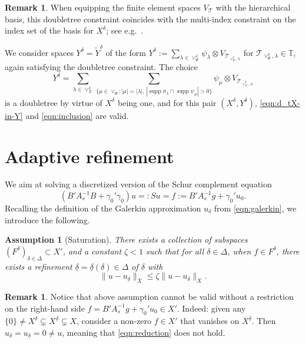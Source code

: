 \documentclass[11pt,a4paper,oneside,english]{amsart}
\numberwithin{equation}{section}
\numberwithin{theorem}{section}
\newtheorem{assum}[theorem]{Assumption}
\theoremstyle{definition}
\newtheorem{remark}[theorem]{Remark}
\DeclareMathOperator{\supp}{supp}
\newcommand{\T}{\mathcal{T}}
\newcommand{\udelta}{{\underline{\delta}}}
\begin{document}
\begin{remark}
  When equipping the finite element spaces $V_{\T}$ with the hierarchical basis,
  this doubletree constraint coincides with the multi-index constraint on the index
  set of the basis for $X^\delta$; see e.g.~\cite{TODO}.
\end{remark}

We consider spaces $Y^\delta = \tilde Y^\delta$ of the form
$Y^\delta := \sum_{\lambda \in \vee^\delta_\Psi} \psi_\lambda \otimes V_{\T_{\vee^\delta_\Psi, \lambda}}$
for $\T_{\vee^\delta_\Psi, \lambda} \in \mathbb T$, again satisfying the doubletree
constraint. The choice
\begin{equation}
  Y^\delta = \sum_{\lambda \in \vee_\Sigma^\delta} \sum_{\{\mu \in \vee_\Psi\colon |\mu|=|\lambda|,\,
  |\supp \sigma_\lambda \cap \supp \psi_\mu|>0\}} \psi_\mu \otimes V_{\T_{\vee_\Sigma^\delta,\lambda}}
  \label{eqn:generate-Ydelta}
\end{equation}
is a doubletree by virtue of $X^\delta$ being one, and for this pair $(X^\delta, Y^\delta)$,
\eqref{eqn:d_tX-in-Y} and \eqref{eqn:inclusion} are valid.

\section{Adaptive refinement}
We aim at solving a discretized version of the Schur complement equation
\begin{equation}
  \label{eqn:schur}
 (B' A_s^{-1} B + \gamma_0' \gamma_0)u =: Su = f := B' A_s^{-1}g+\gamma_0' u_0.
\end{equation}
Recalling the definition of the Galerkin approximation $u_\delta$ from \eqref{eqn:galerkin},
we introduce the following.


\begin{assum}[Saturation] \label{assum:saturation}
There exists a collection of subspaces $(F^\delta)_{\delta \in \Delta} \subset X'$, and
a constant $\zeta<1$ such that for all $\delta \in \Delta$, when $f \in F^\delta$,
  there exists a refinement $\udelta = \udelta(\delta) \in \Delta$ of $\delta$ with
\begin{equation}
  \label{eqn:reduction}
  \|u-u_\udelta\|_X \leq \zeta \|u-u_\delta\|_X.
\end{equation}
\end{assum}
\begin{remark} \label{data-oscillation}
  Notice that above assumption cannot be valid without a restriction on the
  right-hand side $f =B' A_s^{-1}g+\gamma_0' u_0\in X'$. Indeed: given any
  $\{0\} \neq X^\delta \subsetneq X^{\udelta} \subsetneq X$, consider a non-zero
  $f \in X'$ that vanishes on $X^{\udelta}$. Then $u_\delta=u_\udelta=0 \neq u$,
  meaning that \eqref{eqn:reduction} does not hold.
\end{remark}
\end{document}
